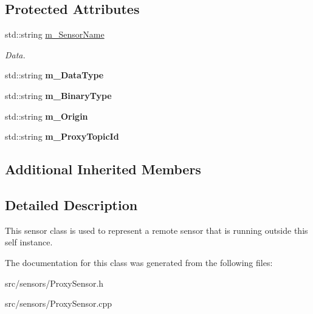 \subsection*{Protected Attributes}
\begin{DoxyCompactItemize}
\item 
\mbox{\label{class_proxy_sensor_a79e9207ed4d74d0e39b01f82859d5b4a}} 
std\+::string \hyperlink{class_proxy_sensor_a79e9207ed4d74d0e39b01f82859d5b4a}{m\+\_\+\+Sensor\+Name}
\begin{DoxyCompactList}\small\item\em Data. \end{DoxyCompactList}\item 
\mbox{\label{class_proxy_sensor_aa33481a2a2647b096cdc9520fcbe2f56}} 
std\+::string {\bfseries m\+\_\+\+Data\+Type}
\item 
\mbox{\label{class_proxy_sensor_a46b266c633d61ad810c2ae62f2658b9c}} 
std\+::string {\bfseries m\+\_\+\+Binary\+Type}
\item 
\mbox{\label{class_proxy_sensor_a574f51f9b1dff01027b466882eda61aa}} 
std\+::string {\bfseries m\+\_\+\+Origin}
\item 
\mbox{\label{class_proxy_sensor_a20f35e96ed407304d5615644a4295bba}} 
std\+::string {\bfseries m\+\_\+\+Proxy\+Topic\+Id}
\end{DoxyCompactItemize}
\subsection*{Additional Inherited Members}


\subsection{Detailed Description}
This sensor class is used to represent a remote sensor that is running outside this self instance. 

The documentation for this class was generated from the following files\+:\begin{DoxyCompactItemize}
\item 
src/sensors/Proxy\+Sensor.\+h\item 
src/sensors/Proxy\+Sensor.\+cpp\end{DoxyCompactItemize}
